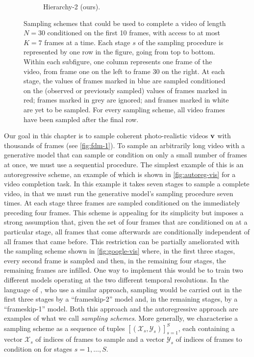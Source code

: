\begin{figure}[t!]
\begin{subfigure}[t]{0.24\textwidth}
        \caption{\footnotesize Hierarchy-2 (ours).} \label{fig:hierarchy-vis}
    \end{subfigure}%
    \caption{Sampling schemes that could be used to complete a video of length $N=30$ conditioned on the first 10 frames, with access to at most $K=7$ frames at a time. Each stage $s$ of the sampling procedure is represented by one row in the figure, going from top to bottom. Within each subfigure, one column represents one frame of the video, from frame one on the left to frame 30 on the right. At each stage, the values of frames marked in blue are sampled conditioned on the (observed or previously sampled) values of frames marked in red; frames marked in grey are ignored; and frames marked in white are yet to be sampled. For every sampling scheme, all video frames have been sampled after the final row.
    }
\end{figure}

Our goal in this chapter is to sample coherent photo-realistic videos ${\mathbf{v}}$ with thousands of frames (see \cref{fig:fdm-1}). 
%
To sample an arbitrarily long video with a generative model that can sample or condition on only a small number of frames at once, we must use a sequential procedure. The simplest example of this is an autoregressive scheme, an example of which is shown in \cref{fig:autoreg-vis} for a video completion task. 
%
In this example it takes seven stages to sample a complete video, in that we must run the generative model's sampling procedure seven times. 
%
At each stage three frames are sampled conditioned on the immediately preceding four frames. This scheme is appealing for its simplicity but imposes a strong assumption that, given the set of four frames that are conditioned on at a particular stage, all frames that come afterwards are conditionally independent of all frames that came before. This restriction can be partially ameliorated with the sampling scheme shown in \cref{fig:google-vis} where, in the first three stages, every second frame is sampled and then, in the remaining four stages, the remaining frames are infilled. One way to implement this would be to train two different models operating at the two different temporal resolutions. 
%
In the language of \citet{ho2022video}, who use a similar approach, sampling would be carried out in the first three stages by a ``frameskip-2'' model and, in the remaining stages, by a ``frameskip-1'' model. Both this approach and the autoregressive approach are examples of what we call \textit{sampling schemes}.
%
More generally, we characterise a sampling scheme as a sequence of tuples $[(\mathcal{X}_s, \mathcal{Y}_s)]_{s=1}^S$, each containing a vector $\mathcal{X}_s$ of indices of frames to sample and a vector $\mathcal{Y}_s$ of indices of frames to condition on for stages $s = 1,\ldots,S$. 

